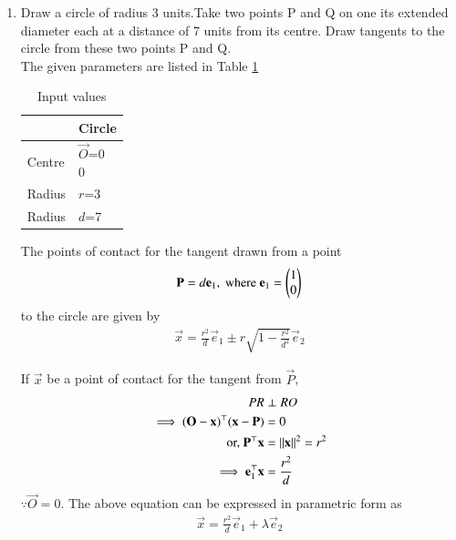 \renewcommand{\theequation}{\theenumi}
\begin{enumerate}[label=\thesubsection.\arabic*.,ref=\thesubsection.\theenumi]
%
\item 
%
Draw a circle of radius 3 units.Take two points P and Q on one its extended diameter each at a distance of 7 units from its centre. Draw tangents to the circle from these two points P and Q. 
\\
\solution The given parameters are listed in Table \ref{tab:table1}
%
\begin{table}[!ht]
\begin{center}
\begin{tabular}{ | m{2cm} | m{2cm} |} 
\hline
 & Circle \\
\hline
Centre  & $\vec{O}$=\myvec{0\\0} \\ 
\hline
Radius & $r$=3  \\ 
\hline
Radius & $d$=7  \\ 
\hline
\end{tabular}
\end{center}
\caption{Input values}
\label{tab:table1}
\end{table}
%
\begin{lemma}
  \label{lemma/linman/circ/contact/final}
  The points of contact for the tangent drawn from a point 
%
\begin{align}
  \mathbf{P} = d\mathbf{e}_1, \text{ where } \mathbf{e}_1 = \begin{pmatrix}1\\0\end{pmatrix}
  \end{align}
  to the circle are given by 
  \begin{align}
    \vec{x} = \frac{r^2}{d}\vec{e}_1  \pm r\sqrt{1 - \frac{r^2}{d^2}} \vec{e}_2
    \label{linman/circ/contact/final}
   \end{align}
%   
\end{lemma}
If $\vec{x}$ be a point of contact for the tangent from $\vec{P}$, 
\begin{align}
PR &\perp RO
\\
 \implies (\mathbf{O}-\mathbf{x})^{\top} (\mathbf{x}-\mathbf{P}) &= 0
 \\
 \text{or, }  \mathbf{P}^{\top} \mathbf{x} &=\left\lVert\mathbf{x}\right\rVert^2 = r^2
 \\
 \implies \mathbf{e}_1^{\top} \mathbf{x} &= \frac{r^2}{d}
  \end{align}
  $\because \vec{O} = 0$.  The above equation can be expressed in parametric form as 
 \begin{align}
  \vec{x} = \frac{r^2}{d}\vec{e}_1 + \lambda \vec{e}_2

\end{align}
\end{enumerate}
